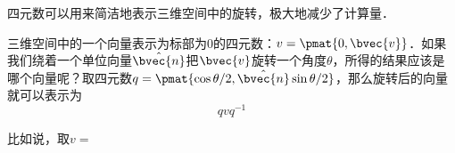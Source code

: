 

四元数可以用来简洁地表示三维空间中的旋转，极大地减少了计算量．

三维空间中的一个向量表示为标部为$0$的四元数：$v=\pmat{0, \bvec{v}}$．如果我们绕着一个单位向量$\hat{\bvec{n}}$把$\bvec{v}$旋转一个角度$\theta$，所得的结果应该是哪个向量呢？取四元数$q=\pmat{\cos{\theta/2}, \hat{\bvec{n}}\sin{\theta/2}}$，那么旋转后的向量就可以表示为
\begin{equation}
qvq^{-1}
\end{equation}

比如说，取$v=$










